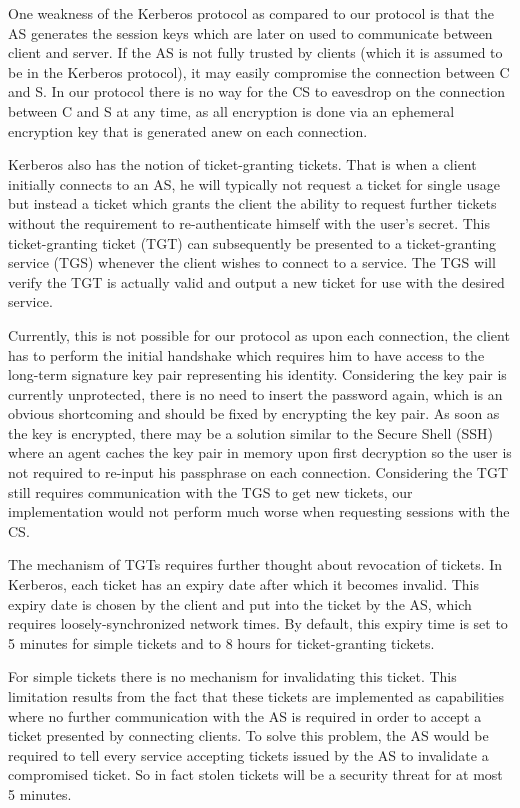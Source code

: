 One weakness of the Kerberos protocol as compared to our protocol is that the AS generates the session keys which are later on used to communicate between client and server.
If the AS is not fully trusted by clients (which it is assumed to be in the Kerberos protocol), it may easily compromise the connection between C and S.
In our protocol there is no way for the CS to eavesdrop on the connection between C and S at any time, as all encryption is done via an ephemeral encryption key that is generated anew on each connection.

\bigskip

Kerberos also has the notion of ticket-granting tickets.
That is when a client initially connects to an AS, he will typically not request a ticket for single usage but instead a ticket which grants the client the ability to request further tickets without the requirement to re-authenticate himself with the user's secret.
This ticket-granting ticket (TGT) can subsequently be presented to a ticket-granting service (TGS) whenever the client wishes to connect to a service.
The TGS will verify the TGT is actually valid and output a new ticket for use with the desired service.

Currently, this is not possible for our protocol as upon each connection, the client has to perform the initial handshake which requires him to have access to the long-term signature key pair representing his identity.
Considering the key pair is currently unprotected, there is no need to insert the password again, which is an obvious shortcoming and should be fixed by encrypting the key pair.
As soon as the key is encrypted, there may be a solution similar to the Secure Shell (SSH) where an agent caches the key pair in memory upon first decryption so the user is not required to re-input his passphrase on each connection.
Considering the TGT still requires communication with the TGS to get new tickets, our implementation would not perform much worse when requesting sessions with the CS.

The mechanism of TGTs requires further thought about revocation of tickets.
In Kerberos, each ticket has an expiry date after which it becomes invalid.
This expiry date is chosen by the client and put into the ticket by the AS, which requires loosely-synchronized network times.
By default, this expiry time is set to 5 minutes for simple tickets and to 8 hours for ticket-granting tickets.

For simple tickets there is no mechanism for invalidating this ticket.
This limitation results from the fact that these tickets are implemented as capabilities where no further communication with the AS is required in order to accept a ticket presented by connecting clients.
To solve this problem, the AS would be required to tell every service accepting tickets issued by the AS to invalidate a compromised ticket.
So in fact stolen tickets will be a security threat for at most 5 minutes.

